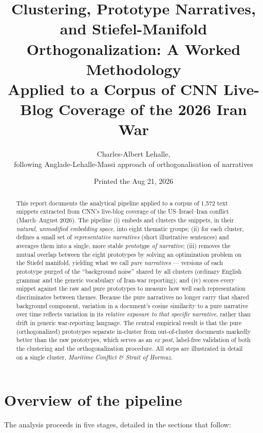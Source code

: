 \documentclass[11pt]{article}
\title{\textbf{Clustering, Prototype Narratives, and Stiefel-Manifold\\
Orthogonalization: A Worked Methodology}\\[4pt]
\large Applied to a Corpus of CNN Live-Blog Coverage of the 2026 Iran War}
\author{Charles-Albert Lehalle,\\[.2em] following Anglade-Lehalle-Massi approach of orthogonalisation of narratives}
\date{Printed the Aug 21, 2026}
\begin{document}
\maketitle
\thispagestyle{fancy}

\begin{abstract}
\noindent This report documents the analytical pipeline applied to a corpus of
1{,}572 text snippets extracted from CNN's live-blog coverage of the
US--Israel--Iran conflict (March--August 2026). The pipeline (i) embeds and
clusters the snippets, in their \emph{natural, unmodified embedding space},
into eight thematic groups; (ii) for each cluster, defines a small set of
\emph{representative narratives} (short illustrative sentences) and averages
them into a single, more stable \emph{prototype of narrative}; (iii) removes
the mutual overlap between the eight prototypes by solving an optimization
problem on the Stiefel manifold, yielding what we call \emph{pure
narratives} --- versions of each prototype purged of the ``background
noise'' shared by all clusters (ordinary English grammar and the generic
vocabulary of Iran-war reporting); and (iv) scores every snippet against
the raw and pure prototypes to measure how well each representation
discriminates between themes. Because the pure narratives no longer carry
that shared background component, variation in a document's cosine
similarity to a pure narrative over time reflects variation in its
\emph{relative exposure to that specific narrative}, rather than drift in
generic war-reporting language. The central empirical result is that the
pure (orthogonalized) prototypes separate in-cluster from out-of-cluster
documents markedly better than the raw prototypes, which serves as an
\emph{ex post}, label-free validation of both the clustering and the
orthogonalization procedure. All steps are illustrated in detail on a
single cluster, \textit{Maritime Conflict \& Strait of Hormuz}.
\end{abstract}

\section{Overview of the pipeline}

The analysis proceeds in five stages, detailed in the sections that follow:
\end{document}
